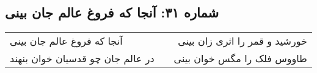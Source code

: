 \begin{center}
\section*{شماره ۳۱: آنجا که فروغ عالم جان بینی}
\label{sec:031}
\begin{longtable}{l p{0.5cm} r}
آنجا که فروغ عالم جان بینی
&&
خورشید و قمر را اثری زان بینی
\\
در عالم جان چو قدسیان خوان بنهند
&&
طاووس فلک را مگس خوان بینی
\\
\end{longtable}
\end{center}
